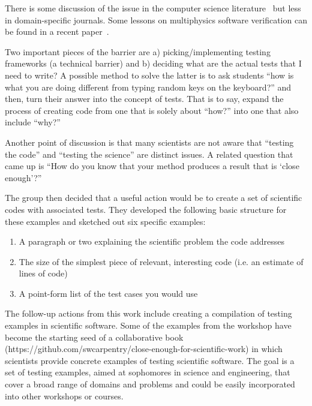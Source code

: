 \documentclass[11pt, oneside]{amsart}
\newcommand{\katznote}[1]{ {\textcolor{magenta}    { ***Dan:      #1 }}}
\newcommand{\clunenote}[1]{ {\textcolor{orange}    { ***Tom:      #1 }}}
\begin{document}

%

There is some discussion of the issue in the computer science
literature~\cite{hook1,hook2} but less in domain-specific journals. Some lessons
on multiphysics software verification can be found in a recent
paper~\cite{dubey-FLASH}.

Two important pieces of the barrier are a) picking/implementing testing
frameworks (a technical barrier) and b) deciding what are the actual tests that
I need to write? A possible method to solve the latter is to ask students ``how
is what you are doing different from typing random keys on the keyboard?'' and
then, turn their answer into the concept of tests. That is to say, expand the
process of creating code from one that is solely about ``how?'' into one that
also include ``why?''

Another point of discussion is that many scientists are not aware that ``testing
the code'' and ``testing the science'' are distinct issues. A related question
that came up is ``How do you know that your method produces a result that is
`close enough'?''

The group then decided that a useful action would be to create a set of
scientific codes with associated tests. They developed the following basic
structure for these examples and sketched out six specific examples:
\begin{enumerate}

\item A paragraph or two explaining the scientific problem the code addresses

\item The size of the simplest piece of relevant, interesting code (i.e. an
estimate of lines of code)

\item A point-form list of the test cases you would use

\end{enumerate}

The follow-up actions from this work include creating a compilation of testing
examples in scientific software. Some of the examples from the workshop have
become the starting seed of a collaborative book
(https://github.com/swcarpentry/close-enough-for-scientific-work) in which
scientists provide concrete examples of testing scientific software. The goal is
a set of testing examples, aimed at sophomores in science and engineering, that
cover a broad range of domains and problems and could be easily incorporated
into other workshops or courses.
 
\end{document}
